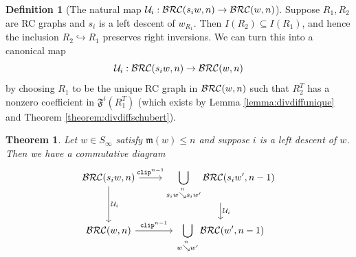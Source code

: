 \documentclass{amsart}
\newtheorem{theorem}{Theorem}[section]
\theoremstyle{definition}
\newtheorem{definition}[lemma]{Definition}
\theoremstyle{remark}
\numberwithin{equation}{subsection}
\newcommand{\downvar}[1]{\stackrel{#1}{\searrow}}
\newcommand{\wof}[1]{w_{#1}}
\newcommand{\rcdd}{\mathfrak{F}}
\newcommand{\maxd}{\mathfrak{m}}
\begin{document}
\begin{definition}[The natural map $\mathcal{U}_i:\mathcal{BRC}(s_iw, n)\to \mathcal{BRC}(w,n)$]
Suppose $R_1, R_2$ are RC graphs and $s_i$ is a left descent of $\wof{R_1}$. Then $I(R_2)\subseteq I(R_1)$, and hence the inclusion $R_2\hookrightarrow R_1$ preserves right inversions. We can turn this into a canonical map 
$$\mathcal{U}_i:\mathcal{BRC}(s_iw, n)\to \mathcal{BRC}(w,n)$$
by choosing $R_1$ to be the unique RC graph in $\mathcal{BRC}(w,n)$ such that $R_2^T$ has a nonzero coefficient in $\rcdd^i(R_1^T)$ (which exists by Lemma \ref{lemma:divdiffunique} and Theorem \ref{theorem:divdiffschubert}).
\end{definition}

\begin{theorem} \label{theorem:commutative_diagram}
Let $w\in S_\infty$ satisfy $\maxd(w)\leq n$ and suppose $i$ is a left descent of $w$. Then we have a commutative diagram
\[
\begin{tikzcd}
\BRC(s_iw, n) \arrow[r, "\clp^{n-1}"] \arrow[d, "\mathcal{U}_i"] & \displaystyle\bigcup_{s_iw\downvar{n} s_iw'}\BRC(s_iw', n-1) \arrow[d, "\mathcal{U}_i"] \\
\BRC(w, n) \arrow[r, "\clp^{n-1}"] & \displaystyle\bigcup_{w\downvar{n} w'}\BRC(w', n-1)
\end{tikzcd}
\]
\end{theorem}
\end{document}
